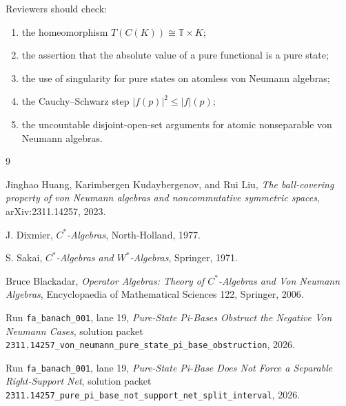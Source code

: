 \documentclass[11pt]{article}
\newcommand{\T}{\mathbb T}
\begin{document}
Reviewers should check:
\begin{enumerate}
    \item the homeomorphism \(T(C(K))\cong\T\times K\);
    \item the assertion that the absolute value of a pure functional is a
          pure state;
    \item the use of singularity for pure states on atomless von Neumann
          algebras;
    \item the Cauchy--Schwarz step \(|f(p)|^2\le |f|(p)\);
    \item the uncountable disjoint-open-set arguments for atomic
          nonseparable von Neumann algebras.
\end{enumerate}

\begin{thebibliography}{9}

Jinghao Huang, Karimbergen Kudaybergenov, and Rui Liu,
\emph{The ball-covering property of von Neumann algebras and noncommutative
symmetric spaces},
arXiv:2311.14257, 2023.

J. Dixmier,
\emph{\(C^*\)-Algebras},
North-Holland, 1977.

S. Sakai,
\emph{\(C^*\)-Algebras and \(W^*\)-Algebras},
Springer, 1971.

Bruce Blackadar,
\emph{Operator Algebras: Theory of \(C^*\)-Algebras and Von Neumann
Algebras},
Encyclopaedia of Mathematical Sciences 122, Springer, 2006.

Run \texttt{fa\_banach\_001}, lane 19,
\emph{Pure-State Pi-Bases Obstruct the Negative Von Neumann Cases},
solution packet
\texttt{2311.14257\_von\_neumann\_pure\_state\_pi\_base\_obstruction}, 2026.

Run \texttt{fa\_banach\_001}, lane 19,
\emph{Pure-State Pi-Base Does Not Force a Separable Right-Support Net},
solution packet
\texttt{2311.14257\_pure\_pi\_base\_not\_support\_net\_split\_interval},
2026.

\end{thebibliography}
\end{document}
